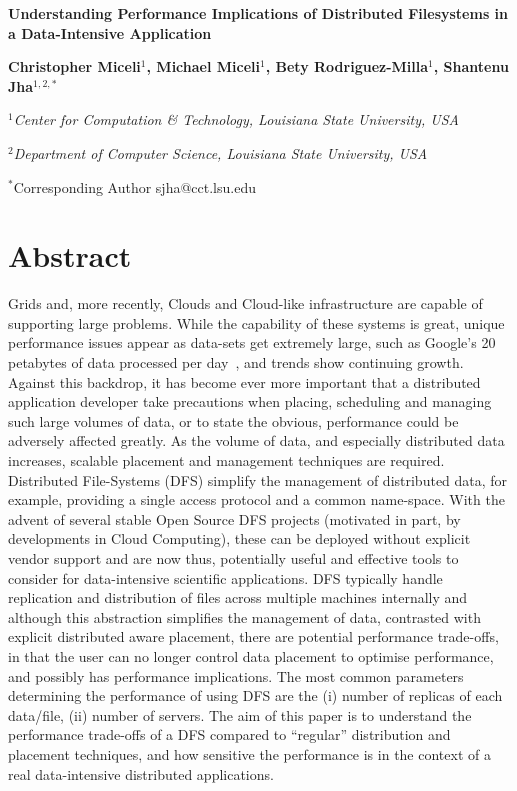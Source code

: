 \documentclass[a4paper,11pt]{article}
\begin{document}
\begin{center}

\textbf{\large Understanding Performance Implications of Distributed Filesystems in a Data-Intensive Application}

\vspace{0.05in}

\textbf{Christopher Miceli$^{1}$, Michael Miceli$^{1}$, Bety Rodriguez-Milla$^{1}$, Shantenu Jha$^{1,2,*}$}

\small{\emph{$^{1}$Center for Computation \& Technology, Louisiana State University, USA}}

\small{\emph{$^{2}$Department of Computer Science, Louisiana State University, USA}}

{\footnotesize {\hspace{0.0 in} $^*$Corresponding Author sjha@cct.lsu.edu}}

\end{center}

\section{Abstract}

Grids and, more recently, Clouds and Cloud-like infrastructure are capable of supporting large problems. While the capability of these systems is great, unique performance issues appear as data-sets get extremely large, such as Google's 20 petabytes of data processed per day~\cite{google}, and trends show continuing growth. Against this backdrop, it has become ever more important that a distributed application developer take precautions when placing, scheduling and managing such large volumes of data, or to state the obvious, performance could be adversely affected greatly. As the volume of data, and especially distributed data increases, scalable placement and management techniques are required.  Distributed File-Systems (DFS) simplify the management of distributed data, for example, providing a single access protocol and a common name-space. With the advent of several stable Open Source DFS projects (motivated in part, by developments in Cloud Computing), these can be deployed without explicit vendor support and are now thus, potentially useful and effective tools to consider for data-intensive scientific applications.  DFS typically handle replication and distribution of files across multiple machines internally and although this abstraction simplifies the management of data, contrasted with explicit distributed aware placement, there are potential performance trade-offs, in that the user can no longer control data placement to optimise performance, and possibly has performance implications.  The most common parameters determining the performance of using DFS are the (i) number of replicas of each data/file, (ii) number of servers. The aim of this paper is to understand the performance trade-offs of a DFS compared to ``regular'' distribution and placement techniques, and how sensitive the performance is in the context of a real data-intensive distributed applications.
\end{document}

